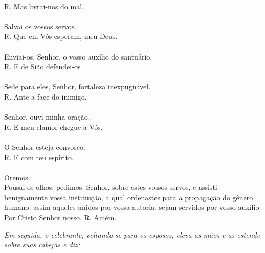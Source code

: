\begin{multicols}{2}
\\R. Mas livrai-nos do mal.
\\
\\Salvai os vossos servos.
\\R. Que em Vós esperam, meu Deus.
\\
\\Enviai-os, Senhor, o vosso auxílio
do santuário.		
\\R. E de Sião defendei-os
\\
\\Sede para eles, Senhor, fortaleza inexpugnável.
\\R. Ante a face do inimigo.
\\
\\Senhor, ouvi minha oração.
\\R. E meu clamor chegue a Vós.
\\
\\O Senhor esteja convosco.
\\R. E com teu espírito.
\\
\\Oremos.
\\Pousai os olhos, pedimos, Senhor, sobre estes vossos servos, e assisti benignamente vossa instituição, a qual ordenastes para a propagação do gênero humano; assim aqueles unidos por vossa autoria, sejam servidos por vosso auxílio. Por Cristo Senhor nosso. R. Amém.

\end{multicols}

\textit{Em seguida, o celebrante, voltando-se para os esposos, eleva as mãos e as
estende sobre suas cabeças e diz:}


